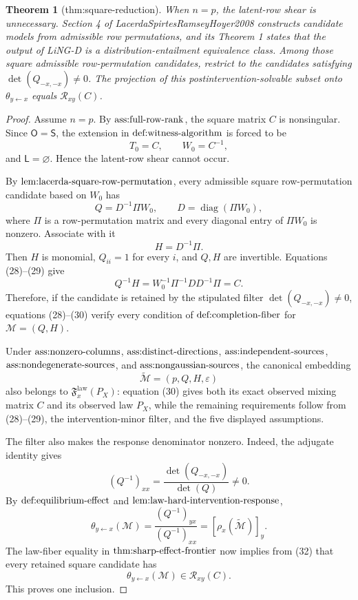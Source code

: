 \documentclass{article}
\newtheorem{theorem}{Theorem}
\begin{document}
\begin{theorem}[thm:square-reduction]\label{thm:square-reduction}
When \(n=p\), the latent-row shear is unnecessary. Section 4 of LacerdaSpirtesRamseyHoyer2008 constructs candidate models from admissible row permutations, and its Theorem 1 states that the output of LiNG-D is a distribution-entailment equivalence class. Among those square admissible row-permutation candidates, restrict to the candidates satisfying \(\det(Q_{-x,-x})\ne0\). The projection of this postintervention-solvable subset onto \(\theta_{y\leftarrow x}\) equals \(\mathcal R_{xy}(C)\).
\end{theorem}
\begin{proof}
Assume \(n=p\).  By \(\textnormal{ass:full-row-rank}\), the square matrix \(C\) is nonsingular.  Since \(\mathsf O=\mathsf S\), the extension in
\(\textnormal{def:witness-algorithm}\) is forced to be
\[
 T_0=C,\qquad W_0=C^{-1},
\]
and \(\mathsf L=\varnothing\).  Hence the latent-row shear cannot occur.

By \(\textnormal{lem:lacerda-square-row-permutation}\), every admissible square row-permutation candidate based on \(W_0\) has
\[
 Q=D^{-1}\Pi W_0,\qquad
 D=\operatorname{diag}(\Pi W_0),                                           \tag{28}
\]
where \(\Pi\) is a row-permutation matrix and every diagonal entry of
\(\Pi W_0\) is nonzero.  Associate with it
\[
 H=D^{-1}\Pi.                                                               \tag{29}
\]
Then \(H\) is monomial, \(Q_{ii}=1\) for every \(i\), and \(Q,H\) are invertible.  Equations (28)--(29) give
\[
 Q^{-1}H
 =W_0^{-1}\Pi^{-1}DD^{-1}\Pi
 =C.                                                                        \tag{30}
\]
Therefore, if the candidate is retained by the stipulated filter
\(\det(Q_{-x,-x})\ne0\), equations (28)--(30) verify every condition of
\(\textnormal{def:completion-fiber}\) for \(\mathcal M=(Q,H)\).

Under \(\textnormal{ass:nonzero-columns}\),
\(\textnormal{ass:distinct-directions}\),
\(\textnormal{ass:independent-sources}\),
\(\textnormal{ass:nondegenerate-sources}\), and
\(\textnormal{ass:nongaussian-sources}\), the canonical embedding
\[
 \widetilde{\mathcal M}=(p,Q,H,\varepsilon)
\]
also belongs to \(\mathfrak F_x^{\mathrm{law}}(P_X)\): equation (30) gives both its exact observed mixing matrix \(C\) and its observed law \(P_X\), while the remaining requirements follow from (28)--(29), the intervention-minor filter, and the five displayed assumptions.

The filter also makes the response denominator nonzero.  Indeed, the adjugate identity gives
\[
 (Q^{-1})_{xx}
 =\frac{\det(Q_{-x,-x})}{\det(Q)}\ne0.                                     \tag{31}
\]
By \(\textnormal{def:equilibrium-effect}\) and
\(\textnormal{lem:law-hard-intervention-response}\),
\[
 \theta_{y\leftarrow x}(\mathcal M)
 =\frac{(Q^{-1})_{yx}}{(Q^{-1})_{xx}}
 =[\rho_x(\widetilde{\mathcal M})]_y.                                      \tag{32}
\]
The law-fiber equality in \(\textnormal{thm:sharp-effect-frontier}\) now implies from (32) that every retained square candidate has
\[
 \theta_{y\leftarrow x}(\mathcal M)\in\mathcal R_{xy}(C).                  \tag{33}
\]
This proves one inclusion.


\end{proof}
\end{document}
